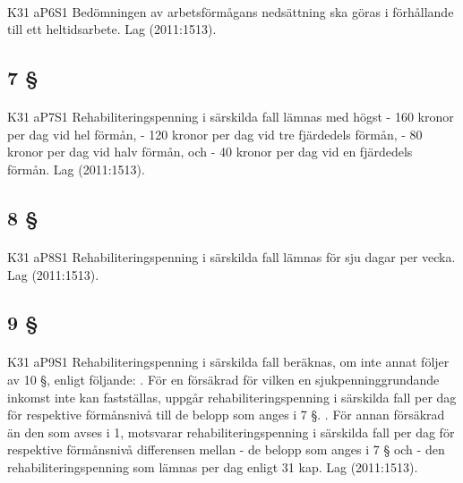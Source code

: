 \documentclass[a4paper,notitlepage,openany,10pt]{book}
\begin{document}
\paragraph*{}
{\tiny K31 aP6S1}
Bedömningen av arbetsförmågans nedsättning ska göras i förhållande till ett heltidsarbete.
Lag (2011:1513).
\subsection*{7 §}
\paragraph*{}
{\tiny K31 aP7S1}
Rehabiliteringspenning i särskilda fall lämnas med högst
\newline - 160 kronor per dag vid hel förmån,
\newline - 120 kronor per dag vid tre fjärdedels förmån,
\newline - 80 kronor per dag vid halv förmån, och
\newline - 40 kronor per dag vid en fjärdedels förmån.
Lag (2011:1513).
\subsection*{8 §}
\paragraph*{}
{\tiny K31 aP8S1}
Rehabiliteringspenning i särskilda fall lämnas för sju dagar per vecka.
Lag (2011:1513).
\subsection*{9 §}
\paragraph*{}
{\tiny K31 aP9S1}
Rehabiliteringspenning i särskilda fall beräknas, om inte annat följer av 10 §, enligt följande:
. För en försäkrad för vilken en sjukpenninggrundande inkomst inte kan fastställas, uppgår rehabiliteringspenning i särskilda fall per dag för respektive förmånsnivå till de belopp som anges i 7 §.
. För annan försäkrad än den som avses i 1, motsvarar rehabiliteringspenning i särskilda fall per dag för respektive förmånsnivå differensen mellan
\newline - de belopp som anges i 7 § och
\newline - den rehabiliteringspenning som lämnas per dag enligt 31 kap.
Lag (2011:1513).
\end{document}
